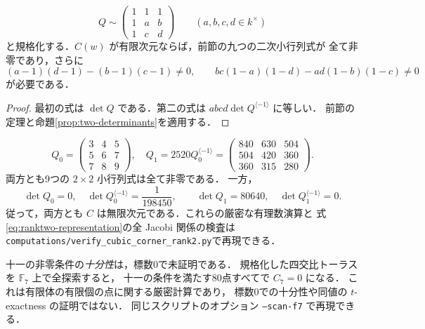 \begin{corollary}[四交比座標での十一の必要条件]
\label{cor:eleven}
\[
 Q\sim
 \begin{pmatrix}1&1&1\\1&a&b\\1&c&d\end{pmatrix}
 \qquad(a,b,c,d\in k^\times)
\]
と規格化する．$C(w)$ が有限次元ならば，前節の九つの二次小行列式が
全て非零であり，さらに
\begin{equation}\label{eq:two-extra-polynomials}
 (a-1)(d-1)-(b-1)(c-1)\ne0,\qquad
 bc(1-a)(1-d)-ad(1-b)(1-c)\ne0
\end{equation}
が必要である．
\end{corollary}
\begin{proof}
最初の式は $\det Q$ である．第二の式は
$abcd\det Q^{\langle-1\rangle}$ に等しい．
前節の定理と命題\ref{prop:two-determinants}を適用する．
\end{proof}

\begin{remark}[九つの小行列式だけでは不十分]
\label{ex:ranktwo}
\[
 Q_0=\begin{pmatrix}3&4&5\\5&6&7\\7&8&9\end{pmatrix},\quad
 Q_1=2520Q_0^{\langle-1\rangle}
 =\begin{pmatrix}840&630&504\\504&420&360\\360&315&280\end{pmatrix}.
\]
両方とも9つの $2\times2$ 小行列式は全て非零である．
一方，
\[
 \det Q_0=0,\quad
 \det Q_0^{\langle-1\rangle}=\frac1{198450},\qquad
 \det Q_1=80640,\quad
 \det Q_1^{\langle-1\rangle}=0.
\]
従って，両方とも $C$ は無限次元である．これらの厳密な有理数演算と
式\eqref{eq:ranktwo-representation}の全 Jacobi 関係の検査は
\texttt{computations/verify\_cubic\_corner\_rank2.py}で再現できる．
\end{remark}

\begin{remark}[有限体での探索と限界]
十一の非零条件の\emph{十分性}は，標数0で未証明である．
規格化した四交比トーラスを $\mathbb F_7$ 上で全探索すると，
十一の条件を満たす80点すべてで $C_7=0$ になる．
これは有限体の有限個の点に関する厳密計算であり，
標数0での十分性や同値の $t$-exactness の証明ではない．
同じスクリプトのオプション \texttt{--scan-f7} で再現できる．
\end{remark}
